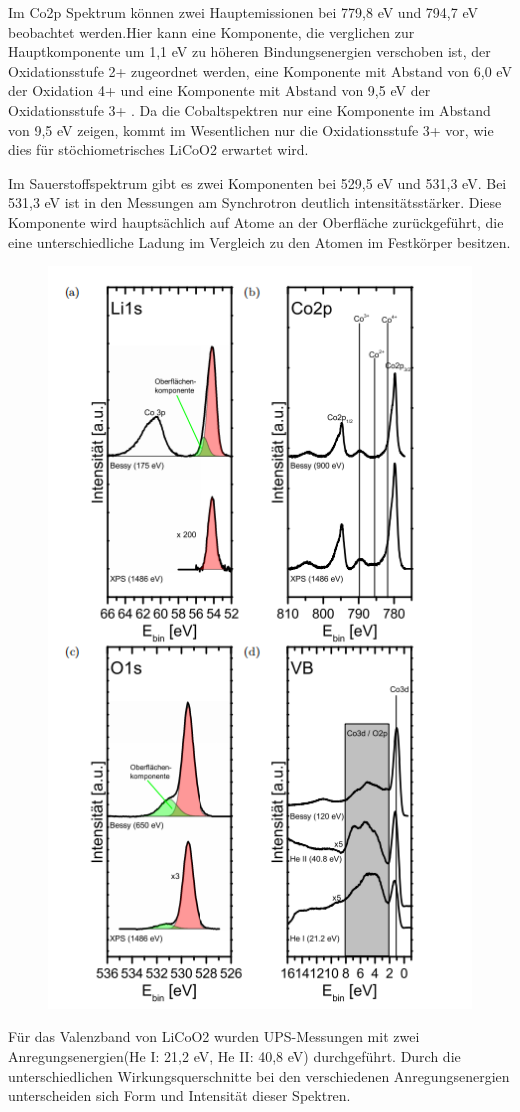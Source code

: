 \documentclass[12pt,UTF8]{article}
\begin{document}
Im Co2p Spektrum können zwei Hauptemissionen bei 779,8 eV und 794,7 eV beobachtet werden.Hier kann eine Komponente, die verglichen zur Hauptkomponente um 1,1 eV zu höheren Bindungsenergien verschoben ist, der Oxidationsstufe 2+ zugeordnet werden, eine Komponente mit Abstand von 6,0 eV der Oxidation 4+ und eine Komponente mit Abstand von 9,5 eV der Oxidationsstufe 3+ . Da die Cobaltspektren nur eine Komponente im Abstand von 9,5 eV zeigen, kommt im Wesentlichen nur die Oxidationsstufe 3+ vor, wie dies für stöchiometrisches LiCoO2 erwartet wird.

Im Sauerstoffspektrum gibt es zwei Komponenten bei 529,5 eV und 531,3 eV. Bei 531,3 eV ist in den Messungen am Synchrotron deutlich intensitätsstärker. Diese Komponente wird hauptsächlich auf Atome an der Oberfläche zurückgeführt, die eine unterschiedliche Ladung im Vergleich zu den Atomen im Festkörper besitzen.

\begin{figure}[H]
    \centering
    \includegraphics[width=.5\linewidth]{Diagramme/fig3_1_4.png}
    \caption{}
\end{figure}

Für das Valenzband von LiCoO2 wurden UPS-Messungen mit zwei Anregungsenergien(He I: 21,2 eV, He II: 40,8 eV) durchgeführt. Durch die unterschiedlichen Wirkungsquerschnitte bei den verschiedenen Anregungsenergien unterscheiden sich Form und Intensität dieser Spektren.
\end{document}
